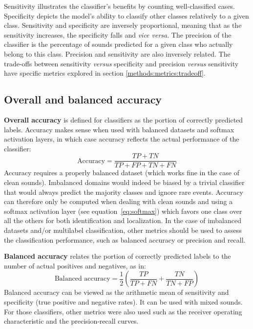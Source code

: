 Sensitivity illustrates the classifier's benefits by counting well-classified cases. Specificity depicts the model's ability to classify other classes relatively to a given class. Sensitivity and specificity are inversely proportional, meaning that as the sensitivity increases, the specificity falls and \textit{vice versa}. The precision of the classifier is the percentage of sounds predicted for a given class who actually belong to this class. Precision and sensitivity are also inversely related. The trade-offs between sensitivity \textit{versus} specificity and precision \textit{versus} sensitivity have specific metrics explored in section \ref{methods:metrics:tradeoff}.

\subsection{Overall and balanced accuracy}

\textbf{Overall accuracy} is defined for classifiers as the portion of correctly predicted labels. Accuracy makes sense when used with balanced datasets and softmax activation layers, in which case accuracy reflects the actual performance of the classifier:
\begin{equation}
\text{Accuracy} = \frac{TP + TN}{TP + FP + TN + FN}
\end{equation}
Accuracy requires a properly balanced dataset (which works fine in the case of clean sounds). Imbalanced domains would indeed be biased by a trivial classifier that would always predict the majority classes and ignore rare events. Accuracy can therefore only be computed when dealing with clean sounds and using a softmax activation layer (see equation~\ref{eq:softmax}) which favors one class over all the others for both identification and localization. In the case of imbalanced datasets and/or multilabel classification, other metrics should be used to assess the classification performance, such as balanced accuracy or precision and recall.

\textbf{Balanced accuracy} relates the portion of correctly predicted labels to the number of actual positives and negatives, as in:
\begin{equation}
\text{Balanced accuracy} = \frac{1}{2} \left( \frac{TP}{TP + FN} + \frac{TN}{TN + FP} \right)
\end{equation}
Balanced accuracy can be viewed as the arithmetic mean of sensitivity and specificity (true positive and negative rates). It can be used with mixed sounds. For those classifiers, other metrics were also used such as the receiver operating characteristic and the precision-recall curves.

